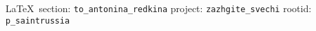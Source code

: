  
 
  
\vspace{0.5cm}
{\small\LaTeX~section: \verb|to_antonina_redkina| project: \verb|zazhgite_svechi| rootid: \verb|p_saintrussia|}
\vspace{0.5cm}
  

